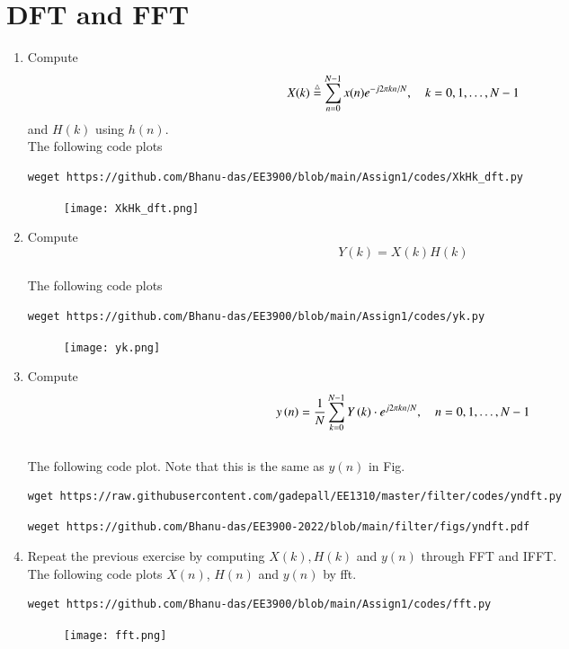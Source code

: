 \documentclass[journal,12pt,twocolumn]{IEEEtran}
\renewcommand\thesection{\arabic{section}}
\begin{document}
\section{DFT and FFT}
\begin{enumerate}[label=\thesection.\arabic*]
\item
Compute
\begin{equation}
X(k) \stackrel{\triangle}{=} \sum _{n=0}^{N-1}x(n) e^{-j2\pi kn/N}, \quad k = 0,1,\dots, N-1
\end{equation}
and $H(k)$ using $h(n)$.
\\
\solution
The following code plots
\begin{lstlisting}
weget https://github.com/Bhanu-das/EE3900/blob/main/Assign1/codes/XkHk_dft.py
\end{lstlisting}
\begin{figure}[!ht]
\centering
\texttt{[image: XkHk\_dft.png]}
\caption{}
\label{fig:XkHk_dft}
\end{figure}
\item Compute 
\begin{equation}
Y(k) = X(k)H(k)
\end{equation}
\\
\solution
The following code plots
\begin{lstlisting}
weget https://github.com/Bhanu-das/EE3900/blob/main/Assign1/codes/yk.py
\end{lstlisting}
\begin{figure}[!ht]
\centering
\texttt{[image: yk.png]}
\caption{}
\label{fig:yk}
\end{figure}
\item Compute
\begin{equation}
 y\left(n\right)={\frac {1}{N}}\sum _{k=0}^{N-1}Y\left(k\right)\cdot e^{j 2\pi kn/N},\quad n = 0,1,\dots, N-1
\end{equation}
\\
\solution The following code plot. Note that this is the same as 
$y(n)$ in  Fig. 

%
\begin{lstlisting}
wget https://raw.githubusercontent.com/gadepall/EE1310/master/filter/codes/yndft.py
\end{lstlisting}
\begin{lstlisting}
weget https://github.com/Bhanu-das/EE3900-2022/blob/main/filter/figs/yndft.pdf
\end{lstlisting}

\item Repeat the previous exercise by computing $X(k), H(k)$ and $y(n)$ through FFT and  IFFT.
\\
\solution
The following code plots $X(n)$, $H(n)$ and $y(n)$ by fft.
\begin{lstlisting}
weget https://github.com/Bhanu-das/EE3900/blob/main/Assign1/codes/fft.py
\end{lstlisting}
\begin{figure}[!ht]
\centering
\texttt{[image: fft.png]}
\caption{}
\label{fig:fft}
\end{figure}



\end{enumerate}
\end{document}
